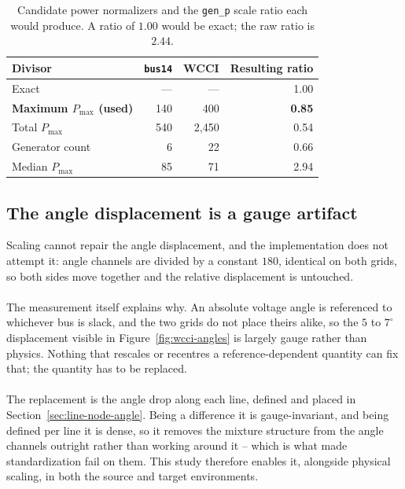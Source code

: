 \begin{table}[H]
  \centering
  \small
  \caption{Candidate power normalizers and the \texttt{gen\_p} scale ratio each
  would produce. A ratio of $1.00$ would be exact; the raw ratio is $2.44$.}
  \label{tab:wcci-normalizer}
  \setlength{\tabcolsep}{8pt}
  \begin{tabular}{lrrr}
    \toprule
    Divisor & \texttt{bus14} & WCCI & Resulting ratio \\
    \midrule
    Exact & --- & --- & 1.00 \\
    \textbf{Maximum $P_{\max}$ (used)} & 140 & 400 & \textbf{0.85} \\
    Total $P_{\max}$ & 540 & 2{,}450 & 0.54 \\
    Generator count & 6 & 22 & 0.66 \\
    Median $P_{\max}$ & 85 & 71 & 2.94 \\
    \bottomrule
  \end{tabular}
\end{table}

\subsection{The angle displacement is a gauge artifact}
\label{sec:wcci-angle-representation}

Scaling cannot repair the angle displacement, and the implementation does not
attempt it: angle channels are divided by a constant $180$, identical on both
grids, so both sides move together and the relative displacement is untouched.
\\
\\
The measurement itself explains why. An absolute voltage angle is referenced to
whichever bus is slack, and the two grids do not place theirs alike, so the $5$
to $7^{\circ}$ displacement visible in Figure~\ref{fig:wcci-angles} is largely
gauge rather than physics. Nothing that rescales or recentres a
reference-dependent quantity can fix that; the quantity has to be replaced.
\\
\\
The replacement is the angle drop along each line, defined and placed in
Section~\ref{sec:line-node-angle}. Being a difference it is gauge-invariant, and
being defined per line it is dense, so it removes the mixture structure from the
angle channels outright rather than working around it -- which is what made
standardization fail on them. This study therefore enables it, alongside
physical scaling, in both the source and target environments.

